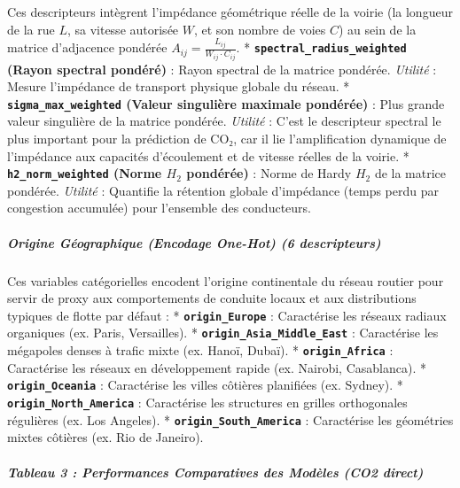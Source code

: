 \documentclass[10pt, a4paper]{article}
\begin{document}
Ces descripteurs intègrent l'impédance géométrique réelle de la voirie
(la longueur de la rue \(L\), sa vitesse autorisée \(W\), et son nombre
de voies \(C\)) au sein de la matrice d'adjacence pondérée
\(A_{ij} = \frac{L_{ij}}{W_{ij} \cdot C_{ij}}\). *
\textbf{\texttt{spectral\_radius\_weighted} (Rayon spectral pondéré)} :
Rayon spectral de la matrice pondérée. \emph{Utilité} : Mesure
l'impédance de transport physique globale du réseau. *
\textbf{\texttt{sigma\_max\_weighted} (Valeur singulière maximale
pondérée)} : Plus grande valeur singulière de la matrice pondérée.
\emph{Utilité} : C'est le descripteur spectral le plus important pour la
prédiction de CO₂, car il lie l'amplification dynamique de l'impédance
aux capacités d'écoulement et de vitesse réelles de la voirie. *
\textbf{\texttt{h2\_norm\_weighted} (Norme \(H_2\) pondérée)} : Norme de
Hardy \(H_2\) de la matrice pondérée. \emph{Utilité} : Quantifie la
rétention globale d'impédance (temps perdu par congestion accumulée)
pour l'ensemble des conducteurs.

\subparagraph{Origine Géographique (Encodage One-Hot) (6
descripteurs)}\label{origine-guxe9ographique-encodage-one-hot-6-descripteurs}

Ces variables catégorielles encodent l'origine continentale du réseau
routier pour servir de proxy aux comportements de conduite locaux et aux
distributions typiques de flotte par défaut : *
\textbf{\texttt{origin\_Europe}} : Caractérise les réseaux radiaux
organiques (ex. Paris, Versailles). *
\textbf{\texttt{origin\_Asia\_Middle\_East}} : Caractérise les mégapoles
denses à trafic mixte (ex. Hanoï, Dubaï). *
\textbf{\texttt{origin\_Africa}} : Caractérise les réseaux en
développement rapide (ex. Nairobi, Casablanca). *
\textbf{\texttt{origin\_Oceania}} : Caractérise les villes côtières
planifiées (ex. Sydney). * \textbf{\texttt{origin\_North\_America}} :
Caractérise les structures en grilles orthogonales régulières (ex. Los
Angeles). * \textbf{\texttt{origin\_South\_America}} : Caractérise les
géométries mixtes côtières (ex. Rio de Janeiro).

\subparagraph{Tableau 3 : Performances Comparatives des Modèles (CO2
direct)}\label{tableau-3-performances-comparatives-des-moduxe8les-co2-direct}
\end{document}
